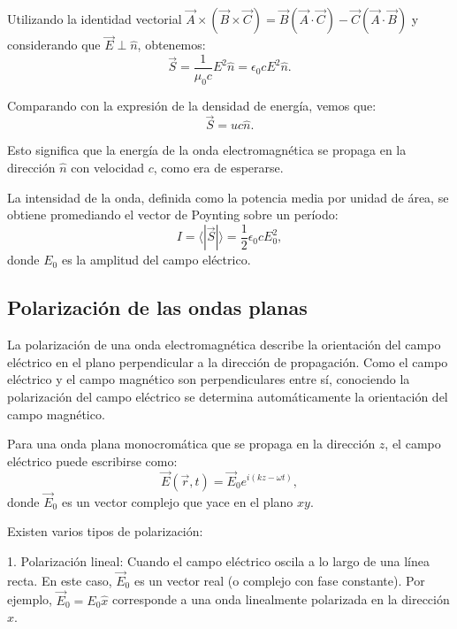 \documentclass[12pt,a4paper]{book}
\begin{document}
Utilizando la identidad vectorial $\vec{A} \times (\vec{B} \times \vec{C}) = \vec{B}(\vec{A} \cdot \vec{C}) - \vec{C}(\vec{A} \cdot \vec{B})$ y considerando que $\vec{E} \perp \hat{n}$, obtenemos:
\begin{equation}
\vec{S} = \frac{1}{\mu_0 c}E^2 \hat{n} = \epsilon_0 c E^2 \hat{n}.
\end{equation}

Comparando con la expresión de la densidad de energía, vemos que:
\begin{equation}
\vec{S} = u c \hat{n}.
\end{equation}

Esto significa que la energía de la onda electromagnética se propaga en la dirección $\hat{n}$ con velocidad $c$, como era de esperarse.

La intensidad de la onda, definida como la potencia media por unidad de área, se obtiene promediando el vector de Poynting sobre un período:
\begin{equation}
I = \langle |\vec{S}| \rangle = \frac{1}{2}\epsilon_0 c E_0^2,
\end{equation}
donde $E_0$ es la amplitud del campo eléctrico.

\subsection{Polarización de las ondas planas}

La polarización de una onda electromagnética describe la orientación del campo eléctrico en el plano perpendicular a la dirección de propagación. Como el campo eléctrico y el campo magnético son perpendiculares entre sí, conociendo la polarización del campo eléctrico se determina automáticamente la orientación del campo magnético.

Para una onda plana monocromática que se propaga en la dirección $z$, el campo eléctrico puede escribirse como:
\begin{equation}
\vec{E}(\vec{r}, t) = \vec{E}_0 e^{i(kz - \omega t)},
\end{equation}
donde $\vec{E}_0$ es un vector complejo que yace en el plano $xy$.

Existen varios tipos de polarización:

1. Polarización lineal: Cuando el campo eléctrico oscila a lo largo de una línea recta. En este caso, $\vec{E}_0$ es un vector real (o complejo con fase constante). Por ejemplo, $\vec{E}_0 = E_0 \hat{x}$ corresponde a una onda linealmente polarizada en la dirección $x$.
\end{document}
